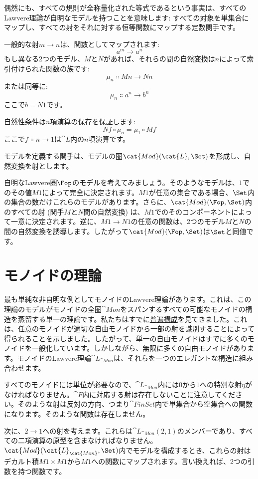 偶然にも、すべての規則が全称量化された等式であるという事実は、すべてのLawvere理論が自明なモデルを持つことを意味します: すべての対象を単集合にマップし、すべての射をそれに対する恒等関数にマップする定数関手です。

一般的な射$m \to n$は、関数としてマップされます: 
\[a^m \to a^n\]
もし異なる2つのモデル、$M$と$N$があれば、それらの間の自然変換は$n$によって索引付けられた関数の族です: 
\[\mu_n \Colon M n \to N n\]
または同等に: 
\[\mu_n \Colon a^n \to b^n\]
ここで$b = N 1$です。

自然性条件は$n$項演算の保存を保証します: 
\[N f \circ \mu_n = \mu_1 \circ M f\]
ここで$f \Colon n \to 1$は$\cat{L}$内の$n$項演算です。

モデルを定義する関手は、モデルの圏$\cat{Mod}(\cat{L}, \Set)$を形成し、自然変換を射とします。

自明なLawvere圏$\Fop$のモデルを考えてみましょう。そのようなモデルは、$1$でのその値$M 1$によって完全に決定されます。$M 1$が任意の集合である場合、$\Set$内の集合の数だけこれらのモデルがあります。さらに、$\cat{Mod}(\Fop, \Set)$内のすべての射 (関手$M$と$N$間の自然変換) は、$M 1$でのそのコンポーネントによって一意に決定されます。逆に、$M 1 \to N 1$の任意の関数は、2つのモデル$M$と$N$の間の自然変換を誘導します。したがって$\cat{Mod}(\Fop, \Set)$は$\Set$と同値です。

\section{モノイドの理論}

最も単純な非自明な例としてモノイドのLawvere理論があります。これは、この理論のモデルがモノイドの全圏$\cat{Mon}$をスパンするすべての可能なモノイドの構造を蒸留する単一の理論です。私たちはすでに\hyperref[free-monoids]{普遍構成}を見てきました。これは、任意のモノイドが適切な自由モノイドから一部の射を識別することによって得られることを示しました。したがって、単一の自由モノイドはすでに多くのモノイドを一般化しています。しかしながら、無限に多くの自由モノイドがあります。モノイドのLawvere理論$\cat{L}_{\cat{Mon}}$は、それらを一つのエレガントな構造に組み合わせます。

すべてのモノイドには単位が必要なので、$\cat{L}_{\cat{Mon}}$内には$0$から$1$への特別な射$\eta$がなければなりません。$\cat{F}$内に対応する射は存在しないことに注意してください。そのような射は反対の方向、つまり$\cat{FinSet}$内で単集合から空集合への関数になります。そのような関数は存在しません。

次に、$2 \to 1$への射を考えます。これらは$\cat{L}_{\cat{Mon}}(2, 1)$のメンバーであり、すべての二項演算の原型を含まなければなりません。$\cat{Mod}(\cat{L}_{\cat{Mon}}, \Set)$内でモデルを構成するとき、これらの射はデカルト積$M 1 \times M 1$から$M 1$への関数にマップされます。言い換えれば、2つの引数を持つ関数です。

